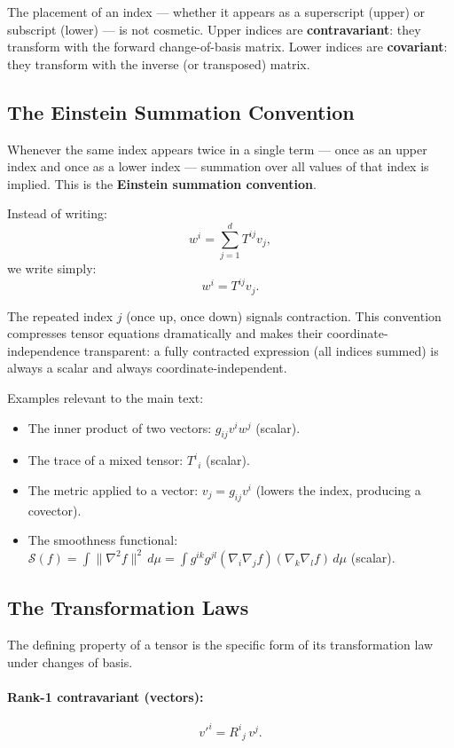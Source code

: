 \documentclass[12pt,a4paper]{article}
\begin{document}
The placement of an index --- whether it appears as a superscript (upper) or subscript (lower) --- is not cosmetic. Upper indices are \textbf{contravariant}: they transform with the forward change-of-basis matrix. Lower indices are \textbf{covariant}: they transform with the inverse (or transposed) matrix.

\subsection{The Einstein Summation Convention}

Whenever the same index appears twice in a single term --- once as an upper index and once as a lower index --- summation over all values of that index is implied. This is the \textbf{Einstein summation convention}.

Instead of writing:
\[
w^i = \sum_{j=1}^d T^{ij} v_j,
\]
we write simply:
\[
w^i = T^{ij} v_j.
\]

The repeated index $j$ (once up, once down) signals contraction. This convention compresses tensor equations dramatically and makes their coordinate-independence transparent: a fully contracted expression (all indices summed) is always a scalar and always coordinate-independent.

Examples relevant to the main text:

\begin{itemize}
\item The inner product of two vectors: $g_{ij} v^i w^j$ (scalar).
\item The trace of a mixed tensor: $T^i{}_i$ (scalar).
\item The metric applied to a vector: $v_j = g_{ij} v^i$ (lowers the index, producing a covector).
\item The smoothness functional: $\mathcal{S}(f) = \int \|\nabla^2 f\|^2 \, d\mu = \int g^{ik} g^{jl} (\nabla_i \nabla_j f)(\nabla_k \nabla_l f) \, d\mu$ (scalar).
\end{itemize}

\subsection{The Transformation Laws}

The defining property of a tensor is the specific form of its transformation law under changes of basis.

\paragraph{Rank-1 contravariant (vectors):}
\[
v'^i = R^i{}_j \, v^j.
\]
\end{document}
